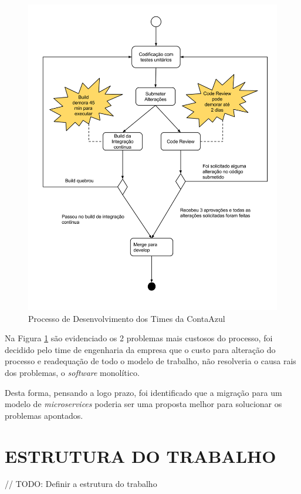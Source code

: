 \begin{figure}[hb]
	\begin{center}
		\includegraphics[width=12cm]{assets/processo_desenvolvimento.png}
		\caption{Processo de Desenvolvimento dos Times da ContaAzul}
		\label{fig:01}
	\end{center}
\end{figure}

Na Figura \ref{fig:01} são evidenciado os 2 problemas mais custosos do processo, foi decidido pelo time de engenharia da empresa que o custo para alteração do processo e readequação de todo o modelo de trabalho, não resolveria o causa rais dos problemas, o \textit{software} monolítico.

Desta forma, pensando a logo prazo, foi identificado que a migração para um modelo de \textit{microservices} poderia ser uma proposta melhor para solucionar os problemas apontados.

\section{ESTRUTURA DO TRABALHO}

// TODO: Definir a estrutura do trabalho 


